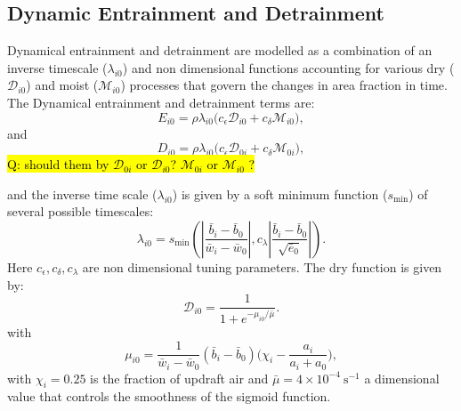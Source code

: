 \documentclass{report}
\begin{document}
\subsection{Dynamic Entrainment and Detrainment} \label{sec:Dynamic Entrainment and Detrainment}
Dynamical entrainment and detrainment are modelled as a combination of an inverse timescale ($\lambda_{i0}$) and non dimensional functions accounting for various dry ($\mathcal{D}_{i0}$) and moist ($\mathcal{M}_{i0}$) processes that govern the changes in area fraction in time. 
The Dynamical entrainment and detrainment terms are:
\begin{equation} \label{eq:fractional_entrainment} 
E_{i0}  = \rho \lambda_{i0} \Bigg( c_{\epsilon} \mathcal{D}_{i0} + c_{\delta}\mathcal{M}_{i0} \Bigg),
\end{equation}
and 
\begin{equation} \label{eq:fractional_detrainment} 
D_{i0} = \rho \lambda_{i0} \Bigg( c_{\epsilon} \mathcal{D}_{0i} + c_{\delta}\mathcal{M}_{0i}\Bigg),
\end{equation}
\hl{Q: should them by  $\mathcal{D}_{0i}$ or  $\mathcal{D}_{i0}$?   $\mathcal{M}_{0i}$ or $\mathcal{M}_{i0}$ ?}

and the inverse time scale ($\lambda_{i0}$) is given by a soft minimum function ($s_{\min}$) of several possible timescales:
\begin{equation} \label{eq:entrainment_timescale} 
\lambda_{i0} = s_{\min} \left( \left| \frac{\bar{b}_i - \bar{b}_0}{\bar{w}_i - \bar{w}_0} \right|, c_{\lambda} \left| \frac{\bar{b}_i - \bar{b}_0}{\sqrt{\bar{e}_0}} \right| \right).
\end{equation}
Here $c_{\epsilon}, c_{\delta}, c_{\lambda}$ are non dimensional tuning parameters. The dry function is given by:
\begin{equation} \label{eq:entr_sigmoid} 
\mathcal{D}_{i0} = \frac{1}{1+e^{-\mu_{i0}/\bar{\mu}}}.
\end{equation}
with
\begin{equation} \label{eq:mu_ij} 
\mu_{i0} = \frac{1}{\bar{w}_i - \bar{w}_0}(\bar{b}_i - \bar{b}_0)\Big(\chi_i - \frac{a_i}{a_i+a_0} \Big),
\end{equation}
with $\chi_i=0.25$ is the fraction of updraft air and $\bar{\mu}=4 \times 10^{-4}~\textrm{s}^{-1}$ a dimensional value that controls the smoothness of the sigmoid function.
\end{document}
